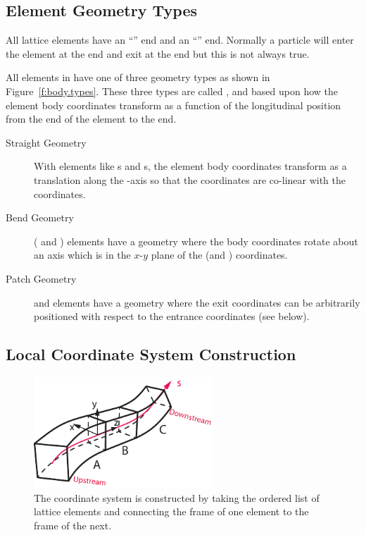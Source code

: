 \documentclass{hitec}
\begin{document}
\subsection{Element Geometry Types}

All lattice elements have an ``'' end and an ``'' end. Normally a particle
will enter the element at the  end and exit at the  end but this is not always
true.

All elements in \bmad have one of three geometry types as shown in Figure~\ref{f:body.types}.  These
three types are called ,  and  based upon how the element body
coordinates transform as a function of the longitudinal  position from the  end
of the element to the  end.
\begin{description}
\item[Straight Geometry] \Newline
With  elements like s and s, the element body coordinates
transform as a translation along the  -axis so that the  coordinates are
co-linear with the  coordinates.
\item[Bend Geometry] \Newline
( and ) elements have a  geometry where the body coordinates rotate
about an axis which is in the $x$-$y$ plane of the  (and ) coordinates.
\item[Patch Geometry] \Newline 
{} and  elements have a  geometry where the exit coordinates can
be arbitrarily positioned with respect to the entrance coordinates (see below).
\end{description}

\subsection{Local Coordinate System Construction}

\begin{figure}[tb]
  \centering
  \includegraphics[width=0.6\textwidth]{element-stream.pdf}
  \caption{The  coordinate system is constructed by taking the ordered list of lattice elements and
connecting the  frame of one element to the  frame of the next.}
  \label{f:leggo}
\end{figure}
\end{document}
